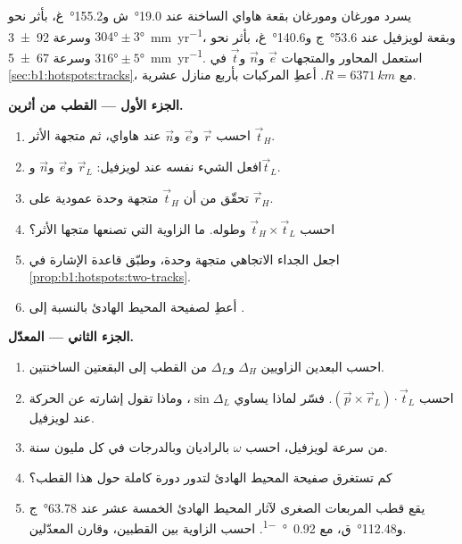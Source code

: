 \begin{problem}
\label{pb:b1:hotspots:1}
يسرد مورغان ومورغان بقعة هاواي الساخنة عند \ang{19.0}~ش و\ang{155.2}~غ، بأثر نحو $\ang{304}\pm\ang{3}$ وسرعة \qty[uncertainty-mode=separate]{92 \pm 3}{mm.yr^{-1}}، وبقعة لويزفيل عند \ang{53.6}~ج و\ang{140.6}~غ، بأثر نحو $\ang{316}\pm\ang{5}$ وسرعة \qty[uncertainty-mode=separate]{67 \pm 5}{mm.yr^{-1}}. استعمل المحاور والمتجهات $\vec e$ و$\vec n$ و$\vec t$ في \cref{sec:b1:hotspots:tracks}، مع $R = \qty{6371}{km}$. أعطِ المركبات بأربع منازل عشرية.

\medskip
\noindent\textbf{الجزء الأول --- القطب من أثرين.}
\begin{enumerate}
  \item احسب $\vec r$ و$\vec e$ و$\vec n$ عند هاواي، ثم متجهة الأثر $\vec t_H$.
  \item افعل الشيء نفسه عند لويزفيل: $\vec r_L$ و$\vec e$ و$\vec n$ و$\vec t_L$.
  \item تحقّق من أن $\vec t_H$ متجهة وحدة عمودية على $\vec r_H$.
  \item احسب $\vec t_H\times\vec t_L$ وطوله. ما الزاوية التي تصنعها متجها الأثر؟
  \item اجعل الجداء الاتجاهي متجهة وحدة، وطبّق قاعدة الإشارة في \cref{prop:b1:hotspots:two-tracks}.
  \item أعطِ    لصفيحة المحيط الهادئ بالنسبة إلى .
\end{enumerate}

\medskip
\noindent\textbf{الجزء الثاني --- المعدّل.}
\begin{enumerate}[resume]
  \item احسب البعدين الزاويين $\Delta_H$ و$\Delta_L$ من القطب إلى البقعتين الساخنتين.
  \item احسب $(\vec p\times\vec r_L)\cdot\vec t_L$. فسّر لماذا يساوي $\sin\Delta_L$، وماذا تقول إشارته عن الحركة عند لويزفيل.
  \item من سرعة لويزفيل، احسب $\omega$ بالراديان وبالدرجات في كل مليون سنة.
  \item كم تستغرق صفيحة المحيط الهادئ لتدور دورة كاملة حول هذا القطب؟
  \item يقع قطب المربعات الصغرى لآثار المحيط الهادئ الخمسة عشر عند \ang{63.78}~ج و\ang{112.48}~ق، مع \qty{0.92}{\degree\per\Myr}. احسب الزاوية بين القطبين، وقارن المعدّلين.
\end{enumerate}


\end{problem}
